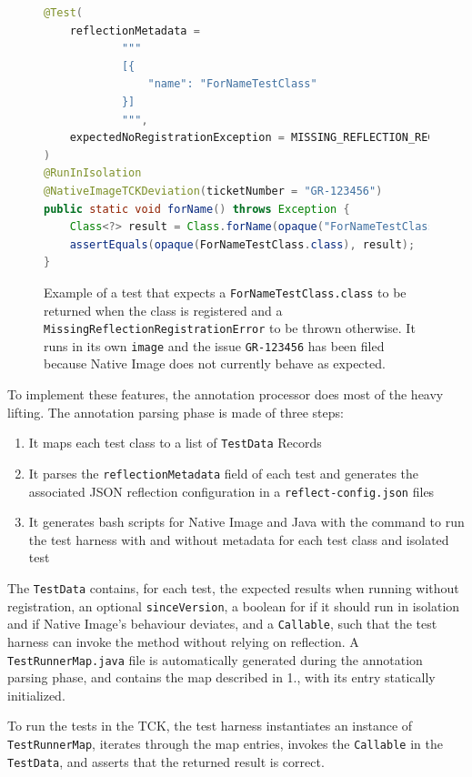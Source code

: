\begin{figure}[ht]
    \centering
\begin{lstlisting}[language=Java]
@Test(
    reflectionMetadata =
            """
            [{
                "name": "ForNameTestClass"
            }]
            """,
    expectedNoRegistrationException = MISSING_REFLECTION_REGISTRATION_ERROR
)
@RunInIsolation
@NativeImageTCKDeviation(ticketNumber = "GR-123456")
public static void forName() throws Exception {
    Class<?> result = Class.forName(opaque("ForNameTestClass"));
    assertEquals(opaque(ForNameTestClass.class), result);
}
\end{lstlisting}
    \caption{Example of a test that expects a \texttt{ForNameTestClass.class} to be returned when the class is registered and a \texttt{MissingReflectionRegistrationError} to be thrown otherwise. It runs in its own \texttt{image} and the issue \texttt{GR-123456} has been filed because Native Image does not currently behave as expected.}
    \label{fig:tck_for_name}
\end{figure}

To implement these features, the annotation processor does most of the heavy lifting. The annotation parsing phase is made of three steps:
\begin{enumerate}
    \item It maps each test class to a list of \verb|TestData| Records 
    \item It parses the \verb|reflectionMetadata| field of each test and generates the associated JSON reflection configuration in a \verb|reflect-config.json| files
    \item It generates bash scripts for Native Image and Java with the command to run the test harness with and without metadata for each test class and isolated test
\end{enumerate}
The \verb|TestData| contains, for each test, the expected results when running without registration, an optional \verb|sinceVersion|, a boolean for if it should run in isolation and if Native Image's behaviour deviates, and a \verb|Callable|, such that the test harness can invoke the method without relying on reflection.  
A \verb|TestRunnerMap.java| file is automatically generated during the annotation parsing phase, and contains the map described in 1., with its entry statically initialized. 

To run the tests in the TCK, the test harness instantiates an instance of \verb|TestRunnerMap|, iterates through the map entries, invokes the \verb|Callable| in the \verb|TestData|, and asserts that the returned result is correct.

